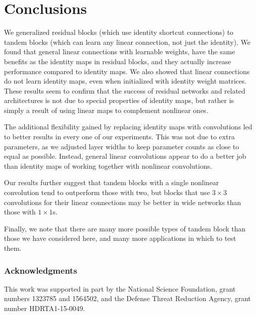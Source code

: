 \documentclass{article} %
\begin{document}
\section{Conclusions}

We generalized residual blocks (which use identity shortcut connections) to tandem blocks (which can learn any linear connection, not just the identity). We found that general linear connections with learnable weights, have the same benefits as the identity maps in residual blocks, and they actually increase performance compared to identity maps. We also showed that linear connections do not learn identity maps, even when initialized with identity weight matrices. These results seem to confirm that the success of residual networks and related architectures is not due to special properties of  identity maps, but rather is simply a result of using linear maps to complement nonlinear ones. 

The additional flexibility gained by replacing identity maps with  convolutions led to better results in every one of our experiments. This was not due to extra parameters, as we adjusted layer widths to keep parameter counts as close to equal as possible. Instead, general linear convolutions appear to do a better job than identity maps of working together with nonlinear convolutions.

Our results further suggest that tandem blocks with a single nonlinear convolution tend to outperform those with two, but blocks that use $3\times 3$ convolutions for their linear connections may be better in wide networks than those with $1\times 1$s.

Finally, we note that there are many more possible types of tandem block than those we have considered here, and many more applications in which to test them. 

\subsubsection*{Acknowledgments}

This work was supported in part by the National Science Foundation, grant numbers 1323785 and 1564502, and the Defense Threat Reduction Agency, grant number HDRTA1-15-0049.


\FloatBarrier



\end{document}
